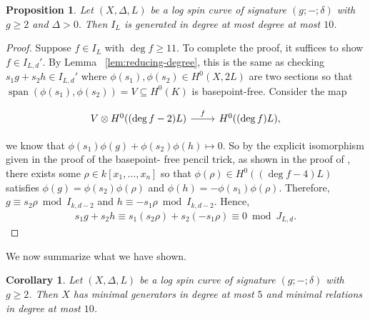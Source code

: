 \documentclass{amsart}
\theoremstyle{plain}
\newtheorem{prop}[thm]{Proposition}
\newtheorem{cor}[thm]{Corollary}
\theoremstyle{definition}
\theoremstyle{remark}
\newtheorem{rem}[thm]{Remark}
\numberwithin{equation}{section}
\newcommand{\halfcan}{L}
\DeclareMathOperator{\newspan}{span}
\begin{document}
\begin{prop}
\label{prop:relation-10}
Let $(X, \Delta, \halfcan)$ be a log spin curve of signature $(g; -; \delta)$
 with $g \geq 2$ and $\Delta > 0.$ Then $I_\halfcan$ is generated in
degree at most degree at most $10$.
\end{prop}
\begin{proof}
Suppose $f \in I_\halfcan$ with $\deg f \geq 11$. To complete the proof,
it suffices to show $f \in I_{\halfcan,d}'$. By Lemma
~\ref{lem:reducing-degree}, this is the same as checking $s_1 g + s_2 h \in
I_{\halfcan, d}'$ where $\phi(s_ 1), \phi(s_2) \in H^0(X, 2L)$ are two sections
so that $\newspan(\phi(s_ 1), \phi(s_2)) = V \subseteq H^0(K)$ is
basepoint-free. Consider the map

$$\begin{tikzcd}
V \otimes H^0((\deg f - 2)L) \ar {r}{f} & H^0((\deg f)L),
\end{tikzcd}$$

\noindent
we know that $\phi(s_1)\phi(g) + \phi(s_2) \phi(h) \mapsto 0$.
So by the explicit isomorphism given in the proof of the basepoint-
free pencil trick, as shown in the proof of \cite[Lemma 2.6]
{saint-donat:proj}, there exists some $\rho \in k[x_1, \ldots, x_n]$
so that $\phi(\rho) \in H^0((\deg f - 4)L)$ satisfies $\phi(g) =
\phi(s_2) \phi(\rho)$ and $\phi(h) = -\phi(s_1)\phi(\rho)$. 
Therefore,
$g \equiv s_2 \rho \bmod I_{k,d-2}$ and $h \equiv - s_1 \rho \bmod
I_{k, d - 2}$. Hence,
\begin{align*}
	s_1g + s_2h \equiv s_1(s_2\rho) + s_2(-s_1 \rho) \equiv 0 \bmod J_
{L,d}.
\end{align*}
\end{proof}


We now summarize what we have shown.

\begin{cor}
\label{cor:g-2-presentation-bound}
Let $(X, \Delta, L)$ be a log spin curve of signature $(g; -;\delta)$
with $g \geq 2$. Then $X$ has minimal generators in degree at most
$5$ and minimal relations in degree at most $10$.
\end{cor}
\end{document}
